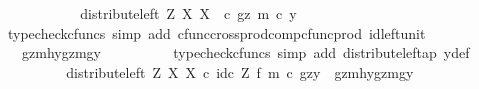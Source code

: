 \begin{isabellebody}
\ \ \ \ \ \ \isamarkupfalse%
\ \isamarkupfalse%
\ {\isachardoublequoteopen}{\isachardot}{\kern0pt}{\isachardot}{\kern0pt}{\isachardot}{\kern0pt}\ {\isacharequal}{\kern0pt}\ distribute{\isacharunderscore}{\kern0pt}left\ Z\ X\ X\ \ {\isasymcirc}\isactrlsub c\ {\isasymlangle}gz{\isacharcomma}{\kern0pt}\ m\ {\isasymcirc}\isactrlsub c\ y{\isasymrangle}{\isachardoublequoteclose}\isanewline
\ \ \ \ \ \ \ \ \isamarkupfalse%
\ {\isacharparenleft}{\kern0pt}typecheck{\isacharunderscore}{\kern0pt}cfuncs{\isacharcomma}{\kern0pt}\ simp\ add{\isacharcolon}{\kern0pt}\ cfunc{\isacharunderscore}{\kern0pt}cross{\isacharunderscore}{\kern0pt}prod{\isacharunderscore}{\kern0pt}comp{\isacharunderscore}{\kern0pt}cfunc{\isacharunderscore}{\kern0pt}prod\ id{\isacharunderscore}{\kern0pt}left{\isacharunderscore}{\kern0pt}unit{}{\isacharparenright}{\kern0pt}\isanewline
\ \ \ \ \ \ \isamarkupfalse%
\ \isamarkupfalse%
\ {\isachardoublequoteopen}{\isachardot}{\kern0pt}{\isachardot}{\kern0pt}{\isachardot}{\kern0pt}\ {\isacharequal}{\kern0pt}\ {\isasymlangle}{\isasymlangle}gz{\isacharcomma}{\kern0pt}mhy{}{\isasymrangle}{\isacharcomma}{\kern0pt}{\isasymlangle}gz{\isacharcomma}{\kern0pt}mgy{}{\isasymrangle}{\isasymrangle}{\isachardoublequoteclose}\isanewline
\ \ \ \ \ \ \ \ \isamarkupfalse%
\ {\isacharparenleft}{\kern0pt}typecheck{\isacharunderscore}{\kern0pt}cfuncs{\isacharcomma}{\kern0pt}\ simp\ add{\isacharcolon}{\kern0pt}\ distribute{\isacharunderscore}{\kern0pt}left{\isacharunderscore}{\kern0pt}ap\ y{\isacharunderscore}{\kern0pt}def{\isacharparenright}{\kern0pt}\isanewline
\ \ \ \ \ \ \isamarkupfalse%
\ \isamarkupfalse%
\ {\isachardoublequoteopen}{\isacharparenleft}{\kern0pt}distribute{\isacharunderscore}{\kern0pt}left\ Z\ X\ X\ {\isasymcirc}\isactrlsub c\ id\isactrlsub c\ Z\ {\isasymtimes}\isactrlsub f\ m{\isacharparenright}{\kern0pt}\ {\isasymcirc}\isactrlsub c\ {\isasymlangle}gz{\isacharcomma}{\kern0pt}y{\isasymrangle}\ {\isacharequal}{\kern0pt}\ {\isasymlangle}{\isasymlangle}gz{\isacharcomma}{\kern0pt}mhy{}{\isasymrangle}{\isacharcomma}{\kern0pt}{\isasymlangle}gz{\isacharcomma}{\kern0pt}mgy{}{\isasymrangle}{\isasymrangle}{\isachardoublequoteclose}\isacommand{{\isachardot}{\kern0pt}}\isamarkupfalse%
\isanewline
\ \ \ \ \isamarkupfalse%
\isanewline
\ \ \isamarkupfalse%
\isanewline
{}\isamarkupfalse%
%
\endisatagproof
{\isafoldproof}%
%
\isadelimproof

\end{isabellebody}
